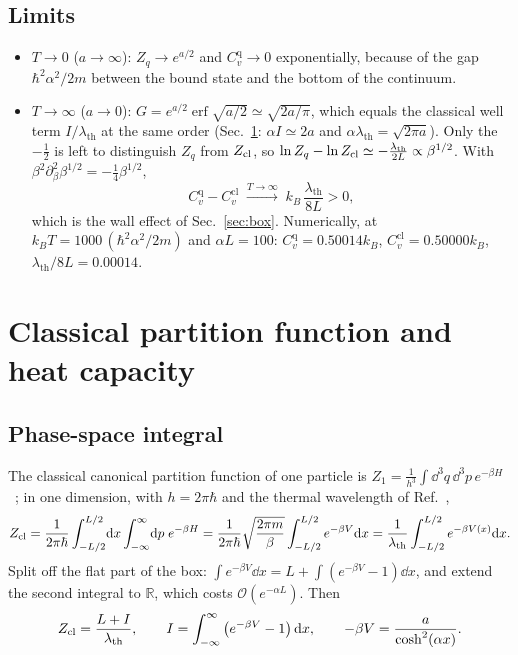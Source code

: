 \documentclass[11pt]{article}
\numberwithin{equation}{section}
\providecommand{\erf}{\operatorname{erf}}
\newcommand{\lth}{\lambda_{\mathrm{th}}}
\newcommand{\Cq}{C_v^{\mathrm{q}}}
\newcommand{\Ccl}{C_v^{\mathrm{cl}}}
\newcommand{\kB}{k_{B}}
\newcommand{\Eu}{\hbar^2\alpha^2/2m}
\begin{document}
\subsection{Limits}
\label{sec:Cqlimits}
\begin{itemize}[itemsep=2pt]
\item $T\to0$ ($a\to\infty$): $Z_q\to e^{a/2}$ and $\Cq\to0$ exponentially, because of the gap $\Eu$ between the bound state and the bottom of the continuum.
\item $T\to\infty$ ($a\to0$): $G=e^{a/2}\erf\sqrt{a/2}\simeq\sqrt{2a/\pi}$, which equals the classical well term $I/\lth$ at the same order (Sec.~\ref{sec:classical}: $\alpha I\simeq2a$ and $\alpha\lth=\sqrt{2\pi a}$). Only the $-\frac12$ is left to distinguish $Z_q$ from $Z_{\rm cl}$, so $\ln Z_q-\ln Z_{\rm cl}\simeq-\frac{\lth}{2L}\propto\beta^{1/2}$. With $\beta^2\partial_\beta^2\beta^{1/2}=-\frac14\beta^{1/2}$,
\begin{equation}
\Cq-\Ccl\;\xrightarrow{T\to\infty}\;\kB\,\frac{\lth}{8L}>0,
\label{eq:wallterm}
\end{equation}
which is the wall effect of Sec.~\ref{sec:box}. Numerically, at $\kB T=1000\,(\Eu)$ and $\alpha L=100$: $\Cq=0.50014\kB$, $\Ccl=0.50000\kB$, $\lth/8L=0.00014$.
\end{itemize}

\section{Classical partition function and heat capacity}
\label{sec:classical}

\subsection{Phase-space integral}
The classical canonical partition function of one particle is $Z_1=\frac{1}{h^3}\int\dd^3q\,\dd^3p\,e^{-\beta H}$~\cite[p.~32, \S2.1, Eq.~(2.1)]{tongSP}; in one dimension, with $h=2\pi\hbar$ and the thermal wavelength of Ref.~\cite[p.~35, Eq.~(2.6)]{tongSP},
\begin{equation}
Z_{\rm cl}=\frac{1}{2\pi\hbar}\int_{-L/2}^{L/2}\!\dd x\int_{-\infty}^{\infty}\!\dd p\;e^{-\beta H}
=\frac{1}{2\pi\hbar}\sqrt{\frac{2\pi m}{\beta}}\int_{-L/2}^{L/2}e^{-\beta V}\dd x
=\frac{1}{\lth}\int_{-L/2}^{L/2}e^{-\beta V(x)}\dd x .
\end{equation}
Split off the flat part of the box: $\int e^{-\beta V}\dd x=L+\int(e^{-\beta V}-1)\dd x$, and extend the second integral to $\mathbb R$, which costs $\mathcal O(e^{-\alpha L})$. Then
\begin{equation}
Z_{\rm cl}=\frac{L+I}{\lth},\qquad I=\int_{-\infty}^{\infty}\left(e^{-\beta V}-1\right)\dd x,\qquad -\beta V=\frac{a}{\cosh^2(\alpha x)} .
\label{eq:Zcl}
\end{equation}
\end{document}
